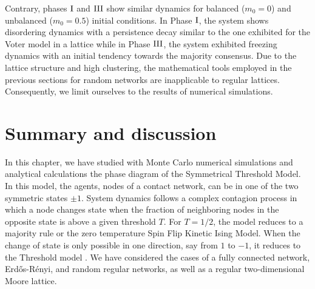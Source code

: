 \begin{figure}[ht]
{		%
		}
\end{figure}
Contrary, phases ${\rm I}$ and ${\rm III}$ show similar dynamics for balanced ($m_0 = 0$) and unbalanced ($m_0 = 0.5$) initial conditions. In Phase ${\rm I}$, the system shows disordering dynamics with a persistence decay similar to the one exhibited for the Voter model in a lattice \cite{ben-naim-1996} while in Phase ${\rm III}$, the system exhibited freezing dynamics with an initial tendency towards the majority consensus. Due to the lattice structure and high clustering, the mathematical tools employed in the previous sections for random networks are inapplicable to regular lattices. Consequently, we limit ourselves to the results of numerical simulations.


\section{\label{sec:Summary and Conclusions} Summary and discussion}

In this chapter, we have studied with Monte Carlo numerical simulations and analytical calculations the phase diagram of the Symmetrical Threshold Model. In this model, the agents, nodes of a contact  network, can be in one of the two symmetric states $\pm 1$.  System dynamics follows a complex contagion process in which a node changes state when the fraction of neighboring nodes in the opposite state is above a given threshold $T$. For $T=1/2$, the model reduces to a majority rule or the zero temperature Spin Flip Kinetic Ising Model. When the change of state is only possible in one direction, say from $1$ to $-1$, it reduces to the Threshold model \cite{granovetter-1978,watts-2002}. We have considered the cases of a fully connected network, Erd\H{o}s-Rényi, and random regular networks, as well as a regular two-dimensional Moore lattice. 

